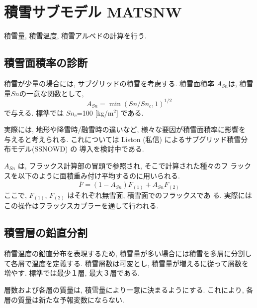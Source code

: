 \section{積雪サブモデル MATSNW}

積雪量, 積雪温度, 積雪アルベドの計算を行う. 

\subsection{積雪面積率の診断}

積雪が少量の場合には, サブグリッドの積雪を考慮する. 
積雪面積率 $A_{Sn}$は, 積雪量$Sn$の一意な関数として, 
\begin{equation}
 A_{Sn} = \min(Sn/Sn_{c}, 1)^{1/2} 
\label{snow_asn}
\end{equation}
で与える. 標準では $Sn_c$=100 [kg/m$^2$] である. 

実際には, 地形や降雪時/融雪時の違いなど, 様々な要因が積雪面積率に影響を
与えると考えられる. 
これについては Liston (私信) によるサブグリッド積雪分布モデル(SSNOWD) の
導入を検討中である. 

$A_{Sn}$ は, フラックス計算部の冒頭で参照され, そこで計算された種々のフ
ラックスを以下のように面積重み付け平均するのに用いられる. 
\begin{equation}
 \overline{F} = (1-A_{Sn}) F_{(1)} + A_{Sn} F_{(2)}
\end{equation}
ここで, $F_{(1)}$, $F_{(2)}$ はそれぞれ無雪面, 積雪面でのフラックスであ
る. 実際にはこの操作はフラックスカプラーを通して行われる. 

\subsection{積雪層の鉛直分割}

積雪温度の鉛直分布を表現するため, 積雪量が多い場合には積雪を多層に分割し
て各層で温度を定義する. 
積雪層数は可変とし, 積雪量が増えるに従って層数を増やす. 標準では最少１層,
最大３層である. 

層数および各層の質量は, 積雪量により一意に決まるようにする. これにより,
各層の質量は新たな予報変数にならない. 


